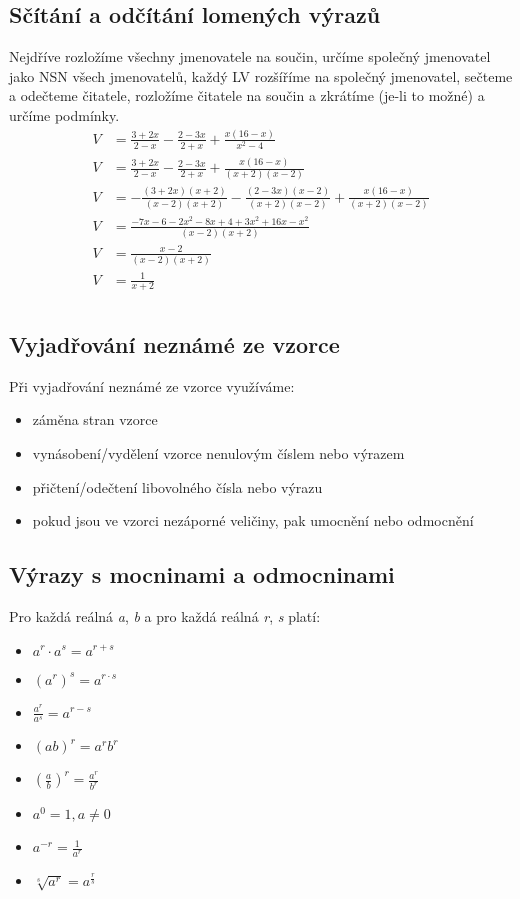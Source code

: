 \documentclass[12pt, a4paper]{article}
\begin{document}
\subsection*{Sčítání a odčítání lomených výrazů}
Nejdříve rozložíme všechny jmenovatele na součin, určíme společný jmenovatel jako NSN všech jmenovatelů, každý LV rozšíříme na společný jmenovatel, sečteme a odečteme čitatele, rozložíme čitatele na součin a zkrátíme (je-li to možné) a určíme podmínky.\\
\[
\begin{aligned}
	V &= \frac{3+2x}{2-x}-\frac{2-3x}{2+x}+\frac{x(16-x)}{x^2-4}\\
	V &= \frac{3+2x}{2-x}-\frac{2-3x}{2+x}+\frac{x(16-x)}{(x+2)(x-2)}\\
	V &=  -\frac{(3+2x)(x+2)}{(x-2)(x+2)}-\frac{(2-3x)(x-2)}{(x+2)(x-2)}+\frac{x(16-x)}{(x+2)(x-2)}\\
	V &= \frac{-7x-6-2x^2-8x+4+3x^2+16x-x^2}{(x-2)(x+2)}\\
	V &= \frac{x-2}{(x-2)(x+2)}\\
	V &= \frac{1}{x+2}\\
\end{aligned}
\]

\subsection*{Vyjadřování neznámé ze vzorce}
Při vyjadřování neznámé ze vzorce využíváme:
\begin{itemize}
	\item záměna stran vzorce
	\item vynásobení/vydělení vzorce nenulovým číslem nebo výrazem
	\item přičtení/odečtení libovolného čísla nebo výrazu
	\item pokud jsou ve vzorci nezáporné veličiny, pak umocnění nebo odmocnění
\end{itemize} 

\subsection*{Výrazy s mocninami a odmocninami}
Pro každá reálná \textit{a}, \textit{b} a pro každá reálná \textit{r}, \textit{s} platí:
\begin{itemize}
	\item $a^r \cdot a^s = a^{r+s}$
	\item $ (a^r)^s = a^{r \cdot s} $
	\item $ \frac{a^r}{a^s} = a^{r-s} $
	\item $ (ab)^r = a^rb^r $
	\item $ (\frac{a}{b})^r = \frac{a^r}{b^r} $
	\item $ a^0 = 1, a \neq 0 $
	\item $ a^{-r} = \frac{1}{a^r} $
	\item $ \sqrt [s]{a^r} = a^{\frac{r}{s}}$
\end{itemize}
\end{document}
